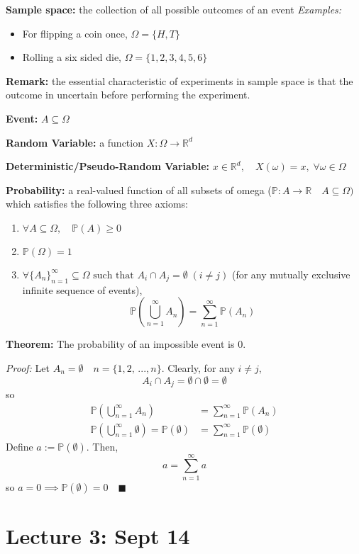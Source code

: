 \documentclass[12pt]{article}
\renewcommand{\P}{\mathbb{P}}
\newcommand{\R}{\mathbb{R}}
\newcommand{\qed}{\quad \blacksquare}
\begin{document}
\textbf{Sample space:} the collection of all possible outcomes of an event 
\emph{Examples:}
\begin{itemize}
    \item For flipping a coin once, $\Omega = \{H, T\}$
    \item Rolling a six sided die, $\Omega = \{1, 2, 3, 4, 5, 6\}$
\end{itemize}

\textbf{Remark:} the essential characteristic of experiments in sample space is that the outcome in uncertain before performing the experiment.

\textbf{Event:} $A \subseteq \Omega$

\textbf{Random Variable:} a function $X: \Omega \to \R^d$ 

\textbf{Deterministic/Pseudo-Random Variable:} $x \in \R^d, \quad X(\omega) = x, \; \forall \omega \in \Omega$

\textbf{Probability:} a real-valued function of all subsets of omega ($\P: A \to \R \quad A \subseteq \Omega)$ which satisfies the following three axioms:
\begin{enumerate}
    \item $\forall A \subseteq \Omega, \quad \P(A) \geq 0$
    \item $\P(\Omega) = 1$
    \item $\forall \{A_n\}_{n=1}^\infty \subseteq \Omega \text{ such that } A_i \cap A_j = \emptyset \; (i \neq j)$ (for any mutually exclusive infinite sequence of events),
    \[\P\left(\bigcup_{n=1}^\infty A_n\right) = \sum_{n=1}^\infty \P(A_n)\]
\end{enumerate}

\textbf{Theorem:} The probability of an impossible event is 0.

\emph{Proof:} 
Let $A_n = \emptyset \quad n = \{1, 2, \,..., n\}$. Clearly, for any $i \neq j$, 
\[A_i \cap A_j = \emptyset \cap \emptyset = \emptyset\] 
so 
\begin{align*}
    \P\left(\bigcup_{n=1}^\infty A_n\right) &= \sum_{n=1}^\infty \P(A_n)\\
    \P\left(\bigcup_{n=1}^\infty \emptyset\right) = \P(\emptyset) &= \sum_{n=1}^\infty \P(\emptyset)
\end{align*}
Define $a := \P(\emptyset)$. Then, 
\[a = \sum_{n=1}^\infty a\]
so $a = 0 \implies \P(\emptyset) = 0 \qed$

\section*{Lecture 3: Sept 14}
\end{document}
